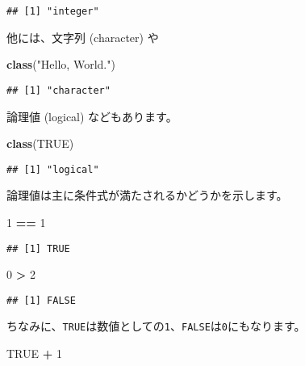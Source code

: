 \documentclass[]{bxjsarticle}
\newenvironment{Shaded}{\begin{snugshade}}{\end{snugshade}}
\newcommand{\DecValTok}[1]{\textcolor[rgb]{0.00,0.00,0.81}{#1}}
\newcommand{\KeywordTok}[1]{\textcolor[rgb]{0.13,0.29,0.53}{\textbf{#1}}}
\newcommand{\NormalTok}[1]{#1}
\newcommand{\OperatorTok}[1]{\textcolor[rgb]{0.81,0.36,0.00}{\textbf{#1}}}
\newcommand{\OtherTok}[1]{\textcolor[rgb]{0.56,0.35,0.01}{#1}}
\newcommand{\StringTok}[1]{\textcolor[rgb]{0.31,0.60,0.02}{#1}}
\begin{document}
\begin{verbatim}
## [1] "integer"
\end{verbatim}

他には、文字列 (character) や

\begin{Shaded}
\begin{Highlighting}[]
\KeywordTok{class}\NormalTok{(}\StringTok{"Hello, World."}\NormalTok{)}
\end{Highlighting}
\end{Shaded}

\begin{verbatim}
## [1] "character"
\end{verbatim}

論理値 (logical) などもあります。

\begin{Shaded}
\begin{Highlighting}[]
\KeywordTok{class}\NormalTok{(}\OtherTok{TRUE}\NormalTok{)}
\end{Highlighting}
\end{Shaded}

\begin{verbatim}
## [1] "logical"
\end{verbatim}

論理値は主に条件式が満たされるかどうかを示します。

\begin{Shaded}
\begin{Highlighting}[]
\DecValTok{1} \OperatorTok{==}\StringTok{ }\DecValTok{1}
\end{Highlighting}
\end{Shaded}

\begin{verbatim}
## [1] TRUE
\end{verbatim}

\begin{Shaded}
\begin{Highlighting}[]
\DecValTok{0} \OperatorTok{>}\StringTok{ }\DecValTok{2}
\end{Highlighting}
\end{Shaded}

\begin{verbatim}
## [1] FALSE
\end{verbatim}

ちなみに、\texttt{TRUE}は数値としての\texttt{1}、\texttt{FALSE}は\texttt{0}にもなります。

\begin{Shaded}
\begin{Highlighting}[]
\OtherTok{TRUE} \OperatorTok{+}\StringTok{ }\DecValTok{1}
\end{Highlighting}
\end{Shaded}
\end{document}
